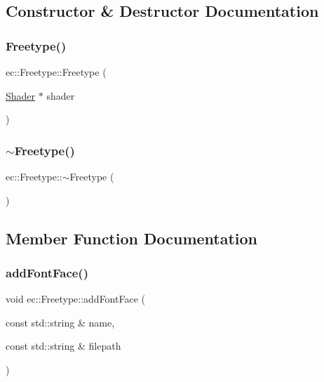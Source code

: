 \subsection{Constructor \& Destructor Documentation}
\mbox{\label{classec_1_1_freetype_a77da5cdd8b053a5fea7c5ffd78c39418}} 
\subsubsection{\texorpdfstring{Freetype()}{Freetype()}}
{\footnotesize\ttfamily ec\+::\+Freetype\+::\+Freetype (\begin{DoxyParamCaption}\item[{\mbox{\hyperlink{classec_1_1_shader}{Shader}} $\ast$}]{shader }\end{DoxyParamCaption})\hspace{0.3cm}{\ttfamily [explicit]}}

\mbox{\label{classec_1_1_freetype_a35e8fad09705600cdd263ed3781d299b}} 
\subsubsection{\texorpdfstring{$\sim$\+Freetype()}{~Freetype()}}
{\footnotesize\ttfamily ec\+::\+Freetype\+::$\sim$\+Freetype (\begin{DoxyParamCaption}{ }\end{DoxyParamCaption})\hspace{0.3cm}{\ttfamily [default]}}



\subsection{Member Function Documentation}
\mbox{\label{classec_1_1_freetype_a7a10e5515342b70588f76328ac83826d}} 
\subsubsection{\texorpdfstring{add\+Font\+Face()}{addFontFace()}}
{\footnotesize\ttfamily void ec\+::\+Freetype\+::add\+Font\+Face (\begin{DoxyParamCaption}\item[{const std\+::string \&}]{name,  }\item[{const std\+::string \&}]{filepath }\end{DoxyParamCaption})}

